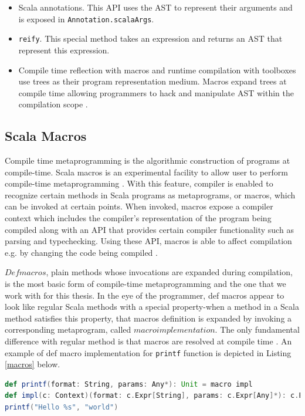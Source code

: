 \begin{itemize}
\item Scala annotations. This API uses the AST to represent their arguments and is exposed in \texttt{Annotation.scalaArgs}. 
\item \texttt{reify}. This special method takes an expression and returns an AST that represent this expression.
\item Compile time reflection with macros \cite{burmako2013scala} and runtime compilation with toolboxes use trees as their program representation medium. Macros expand trees at compile time allowing programmers to hack and manipulate AST within the compilation scope \cite{burmako2013scala}.
\end{itemize} 

\subsection{Scala Macros}
Compile time metaprogramming is the algorithmic construction of programs at compile-time. Scala macros is an experimental facility to allow user to perform compile-time metaprogramming \cite{burmako2012scala}. With this feature, compiler is enabled to recognize certain methods in Scala programs as metaprograms, or macros, which can be invoked at certain points. When invoked, macros expose a compiler context which includes the compiler's representation of the program being compiled along with an API that provides certain compiler functionality such as parsing and typechecking. Using these API, macros is able to affect compilation e.g. by changing the code being compiled \cite{burmako2013scala}.

$Def macros$, plain methods whose invocations are expanded during compilation, is the most basic form of compile-time metaprogramming and the one that we work with for this thesis. In the eye of the programmer, def macros appear to look like regular Scala methods with a special property-when a method in a Scala method satisfies this property, that macros definition is expanded by invoking a corresponding metaprogram, called $macro implementation$. The only fundamental difference with regular method is that macros are resolved at compile time  \cite{burmako2013scala}. An example of def macro implementation for \texttt{printf} function is depicted in Listing \ref{macros} below.
\begin{lstlisting}[language=scala,caption=Macros Printf Function \cite{burmako2013scala}, label = macros]
def printf(format: String, params: Any*): Unit = macro impl
def impl(c: Context)(format: c.Expr[String], params: c.Expr[Any]*): c.Expr[Unit] = ...
printf("Hello %s", "world")
\end{lstlisting}


